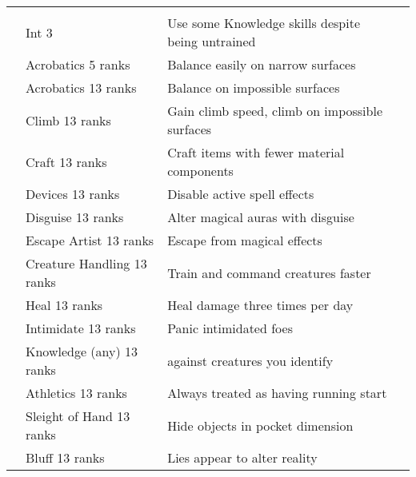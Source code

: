 {\begin{longtabu}{>{\lcol}p{10em} >{\lcol}p{15em} >{\lcol}X >{\lcol}p{3em}}
        \midrule
         &  &  &  \\
         & Int 3 & Use some Knowledge skills despite being untrained &  \\
         & Acrobatics 5 ranks & Balance easily on narrow surfaces &  \\
         & Acrobatics 13 ranks & Balance on impossible surfaces &  \\
         & Climb 13 ranks & Gain climb speed, climb on impossible surfaces &  \\
         & Craft 13 ranks & Craft items with fewer material components &  \\
         & Devices 13 ranks & Disable active spell effects &  \\
         & Disguise 13 ranks & Alter magical auras with disguise &  \\
         & Escape Artist 13 ranks & Escape from magical effects &  \\
         & Creature Handling 13 ranks & Train and command creatures faster &  \\
         & Heal 13 ranks & Heal damage three times per day &  \\
         & Intimidate 13 ranks & Panic intimidated foes &  \\
         & Knowledge (any) 13 ranks &  against creatures you identify &  \\
         & Athletics 13 ranks & Always treated as having running start &  \\
         & Sleight of Hand 13 ranks & Hide objects in pocket dimension &  \\
         & Bluff 13 ranks & Lies appear to alter reality &  \\

\end{longtabu}}
